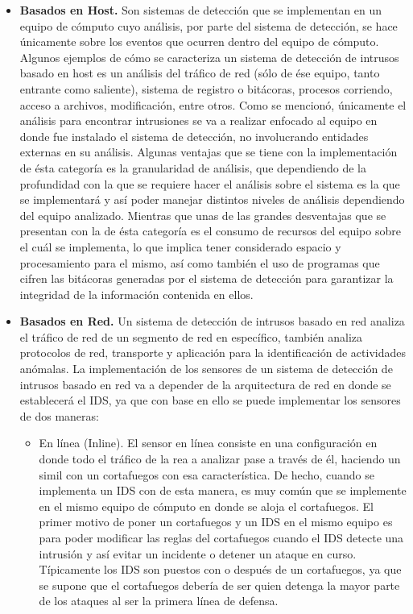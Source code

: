 \begin{itemize}
	\item \textbf{Basados en Host.}
	Son sistemas de detección que se implementan en un equipo de cómputo cuyo análisis, por parte del sistema de detección, se hace únicamente sobre los eventos que ocurren dentro del equipo de cómputo. Algunos ejemplos de cómo se caracteriza un sistema de detección de intrusos basado en host es un análisis del tráfico de red (sólo de ése equipo, tanto entrante como saliente), sistema de registro o bitácoras, procesos corriendo, acceso a archivos, modificación, entre otros. Como se mencionó, únicamente el análisis para encontrar intrusiones se va a realizar enfocado al equipo en donde fue instalado el sistema de detección, no involucrando entidades externas en su análisis. Algunas ventajas que se tiene con la implementación de ésta categoría es la granularidad de análisis, que dependiendo de la profundidad con la que se requiere hacer el análisis sobre el sistema es la que se implementará y así poder manejar distintos niveles de análisis dependiendo del equipo analizado. Mientras que unas de las grandes desventajas que se presentan con la de ésta categoría es el consumo de recursos del equipo sobre el cuál se implementa, lo que implica tener considerado espacio y procesamiento para el mismo, así como también el uso de programas que cifren las bitácoras generadas por el sistema de detección para garantizar la integridad de la información contenida en ellos.\\
	
	\item \textbf{Basados en Red.}
	Un sistema de detección de intrusos basado en red analiza el tráfico de red de un segmento de red en específico, también analiza protocolos de red, transporte y aplicación para la identificación de actividades anómalas. La implementación de los sensores de un sistema de detección de intrusos basado en red va a depender de la arquitectura de red en donde se establecerá el IDS, ya que con base en ello se puede implementar los sensores de dos maneras: \\
	\begin{itemize}
		\item En línea (Inline). El sensor en línea consiste en una configuración en donde todo el tráfico de la rea a analizar pase a través de él, haciendo un simil con un cortafuegos con esa característica. De hecho, cuando se implementa un IDS con de esta manera, es muy común que se implemente en el mismo equipo de cómputo en donde se aloja el cortafuegos. El primer motivo de poner un cortafuegos y un IDS en el mismo equipo es para poder modificar las reglas del cortafuegos cuando el IDS detecte una intrusión y así evitar un incidente o detener un ataque en curso. Típicamente los IDS son puestos con o después de un cortafuegos, ya que se supone que el cortafuegos debería de ser quien detenga la mayor parte de los ataques al ser la primera línea de defensa.\\
		

\end{itemize}
\end{itemize}
